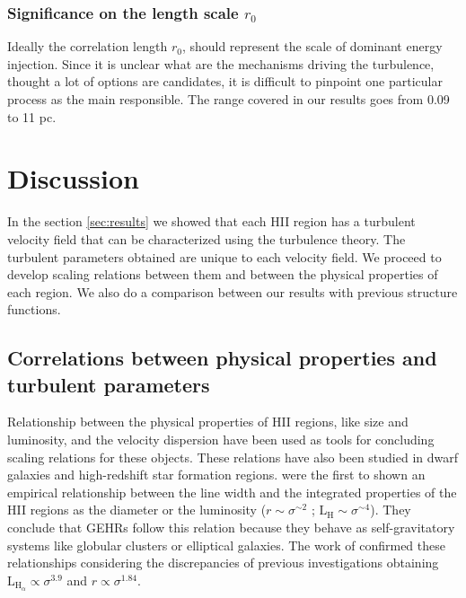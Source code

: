 \documentclass[fleqn,usenatbib, useAMS, a4paper]{mnras}
\begin{document}
\subsubsection{Significance on the length scale \(r_0\)}

Ideally the correlation length \(r_0\), should represent the scale of dominant energy injection. 
Since it is unclear what are the mechanisms driving the turbulence, thought a lot of options are candidates, it is difficult to pinpoint one particular process as the main responsible. 
The range covered in our results goes from 0.09 to 11 pc.


\section{Discussion}\label{sec:discussion}

In the section \ref{sec:results} we showed that each HII region has a turbulent velocity field that can be characterized using the turbulence theory.
The turbulent parameters obtained are unique to each velocity field.
We proceed to develop scaling relations between them and between the physical properties of each region.
We also do a comparison between our results with previous structure functions.

\subsection{Correlations between physical properties and turbulent parameters}

Relationship between the physical properties of HII regions, like size and luminosity, and the velocity dispersion have been used as tools for concluding scaling relations for these objects.
These relations have also been studied in dwarf galaxies and high-redshift star formation regions.
\citet{melnick1977,terlevich1981} were the first to shown an empirical relationship between the line width and the integrated properties of the HII regions as the diameter or the luminosity ($r \sim \sigma ^{\sim 2}$ ; $\text{L}_{\text{H}} \sim \sigma ^{\sim 4}$).
They conclude that GEHRs follow this relation because they behave as self-gravitatory systems like globular clusters or elliptical galaxies.
The work of \citet{1988A&A...201..199A} confirmed these relationships considering the discrepancies of previous investigations obtaining \(\text{L}_{\text{H}_{\alpha}} \propto \sigma^{3.9}\) and \(r \propto \sigma^{1.84}\).
\end{document}
